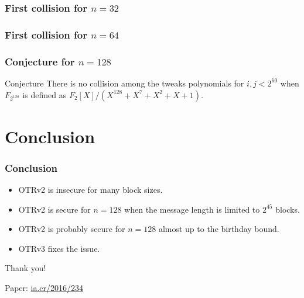 \documentclass{beamer}
\begin{document}
	\begin{frame}
		\frametitle{First collision for $n=32$}
		
		\centering
		\scalebox{0.8}{
			
			}
	\end{frame}
	\begin{frame}
		\frametitle{First collision for $n=64$}
		
		\centering
		\scalebox{0.8}{
			
			}
	\end{frame}


	\begin{frame}
		\frametitle{Conjecture for $n=128$}
		
		\begin{block}{Conjecture}
			There is no collision among the tweaks polynomials for $i, j < 2^{60}$ when $F_{2^{128}}$ is defined as $F_2[X]/(X^{128}+X^{7}+X^{2}+X+1)$.
		\end{block}
	\end{frame}


\section*{Conclusion} %
\label{sec:conclusion}

	\begin{frame}
		\frametitle{Conclusion}
		
		\begin{itemize}
			\item OTRv2 is insecure for many block sizes.
			\item OTRv2 is secure for $n = 128$ when the message length is limited to $2^{45}$ blocks.
			\item OTRv2 is probably secure for $n = 128$ almost up to the birthday bound.
			\item OTRv3 fixes the issue.
		\end{itemize}
	\end{frame}


	\begin{frame}

		\begin{center}
			{\Large Thank you!}
			
			\vspace{1cm}
			Paper: \href{http://ia.cr/2016/234}{ia.cr/2016/234}
		\end{center}
	\end{frame}
	
\end{document}
